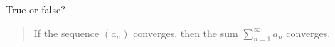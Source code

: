 \documentclass{ximera}
\author{Gregory Hartman \and Matthew Carr}
\begin{document}
\begin{exercise}



True or false?

\begin{quote}
If the sequence $(a_n)$ converges, then the sum $\sum_{n=1}^{\infty} a_n$ converges.
\end{quote}

\begin{multipleChoice}
\end{multipleChoice}

\end{exercise}
\end{document}
